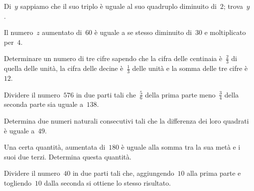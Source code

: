 \begin{multicols}{2}
\begin{esercizio}[\Ast]
\label{ese:16.39}
Di~$y$ sappiamo che il suo triplo è uguale al suo quadruplo diminuito di~$2$; trova~$y$.
\end{esercizio}

\begin{esercizio}
\label{ese:16.40}
Il numero~$z$ aumentato di~$60$ è uguale a se stesso diminuito di~$30$ e moltiplicato per~$4$.
\end{esercizio}

\begin{esercizio}[\Ast]
\label{ese:16.41}
Determinare un numero di tre cifre sapendo che la cifra delle centinaia è~$\frac{2}{3}$ di quella delle unità, la cifra delle decine è~$\frac{1}{3}$ delle unità e la somma delle tre cifre è~$12$.
\end{esercizio}

\begin{esercizio}[\Ast]
\label{ese:16.42}
Dividere il numero~$576$ in due parti tali che~$\frac{5}{6}$ della prima parte meno~$\frac{3}{4}$ della seconda parte sia uguale a~$138$.
\end{esercizio}

\begin{esercizio}[\Ast]
\label{ese:16.43}
Determina due numeri naturali consecutivi tali che la differenza dei loro quadrati è uguale a~$49$.
\end{esercizio}

\begin{esercizio}[\Ast]
\label{ese:16.44}
Una certa quantità, aumentata di~$180$ è uguale alla somma tra la sua metà e i suoi due terzi. Determina questa quantità.
\end{esercizio}

\begin{esercizio}[\Ast]
\label{ese:16.45}
Dividere il numero~$40$ in due parti tali che, aggiungendo~$10$ alla prima parte e togliendo~$10$ dalla seconda si ottiene lo stesso risultato.
\end{esercizio}
\end{multicols}

\pagebreak

